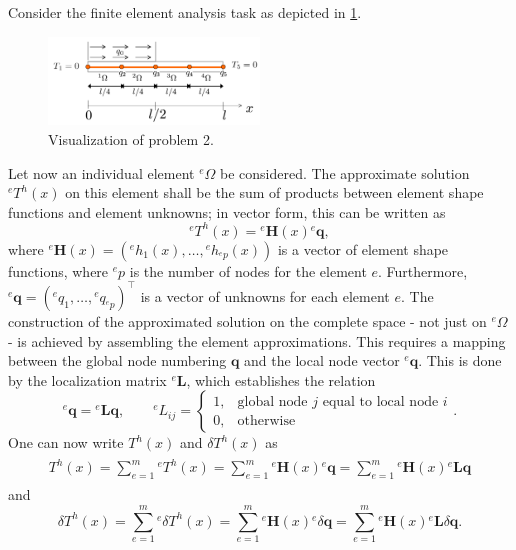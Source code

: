 \documentclass[a4paper,11pt]{article}
\numberwithin{equation}{section}
\newcommand\matr[1]{\ensuremath{\boldsymbol{\mathbf{#1}}}}
\newcommand\vect[1]{\ensuremath{\bm{#1}}}
\begin{document}
{Consider the finite element analysis task as depicted in \cref{fig:prob2}.
\begin{figure}[h]
	\centering
	\includegraphics[width=0.5\textwidth]{figures/prob2.png}
	\caption{Visualization of problem 2.}
	\label{fig:prob2}
\end{figure}
Let now an individual element $^e\Omega$ be considered. The approximate solution $^eT^h(x)$ on this element shall be the sum of products between element shape functions and element unknowns; in vector form, this can be written as \begin{equation}
	^eT^h(x) = {} ^e\vect{H}(x) {}^e\vect{q},
\end{equation} where $^e\vect{H}(x) = ({}^eh_1(x), \dots , {}^eh_{^ep}(x))$ is a vector of element shape functions, where $^ep$ is the number of nodes for the element $e$. Furthermore, $^e\vect{q} = ({}^eq_1,\dots,{}^e q_{^ep})^\top$ is a vector of unknowns for each element $e$. The construction of the approximated solution on the complete space - not just on $^e\Omega$ - is achieved by assembling the element approximations. This requires a mapping between the global node numbering $\vect{q}$ and the local node vector $^e\vect{q}$. This is done by the localization matrix $^e\matr{L}$, which establishes the relation \begin{equation}
	^e\vect{q} ={} ^e\matr{L}\vect{q}, \qquad {}^eL_{ij} = \begin{cases}
		1, & \text{global node $j$ equal to local node $i$} \\
		0, & \text{otherwise}
	\end{cases}.
\end{equation} One can now write $T^h(x)$ and $\delta T^h(x)$ as 
\begin{align}
	\begin{aligned}
		T^h(x) = \sum_{e=1}^{m} {}^e T^h(x) = \sum_{e=1}^{m} {}^e\vect{H}(x) {}^e\vect{q} = \sum_{e=1}^{m} {}^e\vect{H}(x) {}^e\matr{L}\vect{q}
	\end{aligned}
\end{align} and \begin{equation}
	\delta T^h(x) = \sum_{e=1}^{m} {}^e \delta T^h(x) = \sum_{e=1}^{m} {}^e\vect{H}(x) {}^e\delta \vect{q} = \sum_{e=1}^{m} {}^e\vect{H}(x) {}^e\matr{L}\delta\vect{q}.

\end{equation}}
\end{document}
